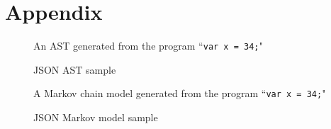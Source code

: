 \documentclass{article}
\begin{document}
\clearpage
\section*{Appendix}

\begin{figure}[h!]
	\caption{JSON AST sample}
	\label{fig:sample-ast}
	\centering
    \vspace{-7pt}
	An AST generated from the program ``{\tt var x = 34;}"

	
\end{figure}

\begin{figure}[h!]
	\caption{JSON Markov model sample}
	\label{fig:sample-model}
	\centering
    \vspace{-7pt}
	A Markov chain model generated from the program ``{\tt var x = 34;}"

	
\end{figure}
\end{document}
